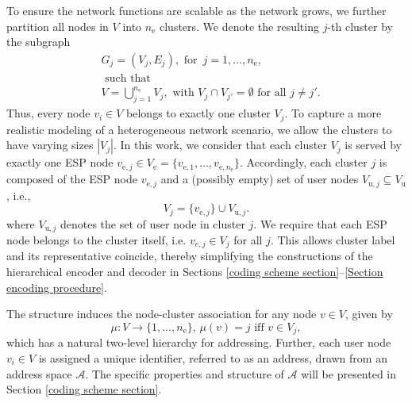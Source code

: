 \documentclass[conference]{IEEEtran}
\begin{document}
To ensure the network functions are scalable as the network grows, we further partition all nodes in $V$ into $n_\mathrm{e}$ clusters. We denote the resulting $j$-th cluster by the subgraph
\begin{align}
    &G_{j} = (V_{j}, E_{j}), \text{ for }\, j=1, \dots, n_\mathrm{e}, \,\\
    &\text{ such that } \nonumber \\ 
    &V=\bigcup_{j=1}^{n_\mathrm{e}} V_{j}, \text{ with } V_{j}\cap V_{j'}=\emptyset \text{ for all }j\neq j'. \nonumber
\end{align} 
Thus, every node $v_i\in V$ belongs to exactly one cluster $V_{j}$. To capture a more realistic modeling of a heterogeneous network scenario, we allow the clusters to have varying sizes $|V_{j}|$. 
In this work, we consider that each cluster $V_{j}$ is served by exactly one ESP node 
$v_{\mathrm{e}, j}\in V_\mathrm{e}=\{v_{\mathrm{e}, 1}, \dots, v_{\mathrm{e}, n_\mathrm{e}}\}$. 
Accordingly, each cluster $j$ is composed of the ESP node $v_{\mathrm{e},j}$ and a (possibly empty) set of user nodes $V_{\mathrm{u},j}\subseteq V_\mathrm{u}$, i.e.,
\[
    V_j = \{v_{\mathrm{e},j}\} \cup V_{\mathrm{u},j}.
\]
where $V_{\mathrm{u},j}$ denotes the set of user node in cluster $j$.
We require that each ESP node belongs to the cluster itself, i.e. $v_{e,j}\in V_j$ for all \(j\). This allows cluster label and its representative coincide, thereby simplifying the constructions of the hierarchical encoder and decoder in Sections \ref{coding scheme section}--\ref{Section encoding procedure}.

The structure induces the node-cluster association for any node $v\in V$, given by
\begin{equation}
    \mu: V \rightarrow \{1, \dots, n_\mathrm{e}\}, \,
    \mu(v)=j \text{ iff } v \in V_{j},    \label{node-cluster}
\end{equation}
which has a natural two-level hierarchy for addressing. Further, each user node $v_i\in V$ is assigned a unique identifier, referred to as an address, drawn from an address space $\mathcal{A}$. The specific properties and structure of $\mathcal{A}$ will be presented in Section \ref{coding scheme section}.

\end{document}

